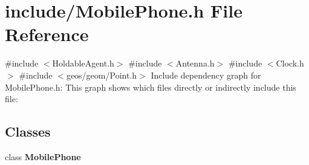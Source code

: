 \section{include/\+Mobile\+Phone.h File Reference}
\label{_mobile_phone_8h}
{\ttfamily \#include $<$Holdable\+Agent.\+h$>$}\newline
{\ttfamily \#include $<$Antenna.\+h$>$}\newline
{\ttfamily \#include $<$Clock.\+h$>$}\newline
{\ttfamily \#include $<$geos/geom/\+Point.\+h$>$}\newline
Include dependency graph for Mobile\+Phone.\+h\+:
This graph shows which files directly or indirectly include this file\+:
\subsection*{Classes}
\begin{DoxyCompactItemize}
\item 
class \textbf{ Mobile\+Phone}
\end{DoxyCompactItemize}
